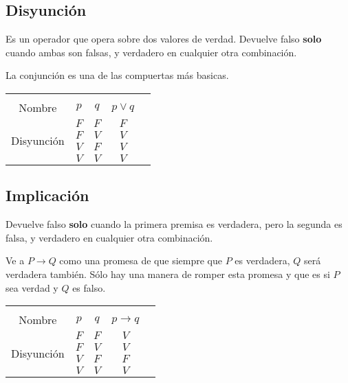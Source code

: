 \documentclass[12pt]{report}                                    %
\begin{document}
        \subsection{Disyunción}

            Es un operador que opera sobre dos valores de verdad. Devuelve falso
            \textbf{solo} cuando ambas son falsas, y verdadero en cualquier
            otra combinación.

            La conjunción es una de las compuertas más basicas. \\

            \begin{tabular}{ |c|c|c|c|c| } 
                \hline &&&\\
                \large{Nombre} & $p$ & $q$ & $p \lor q$ \\[0.5em]
                \hline
                \multirow{4}{5em}{Disyunción}
                & $F$ & $F$ & $F$ \\ \cline{2-4}
                & $F$ & $V$ & $V$ \\ \cline{2-4}
                & $V$ & $F$ & $V$ \\ \cline{2-4}
                & $V$ & $V$ & $V$ \\ 
                \hline
            \end{tabular}





        \clearpage
        \subsection{Implicación}

            Devuelve falso \textbf{solo} cuando la primera premisa es verdadera, pero la 
            segunda es falsa, y verdadero en cualquier otra combinación.

            Ve a $P \to Q$ como una promesa de que siempre que $P$ es verdadera, $Q$ será verdadera también.
            Sólo hay una manera de romper esta promesa y que es si $P$ sea verdad y $Q$ es falso.\\


            \begin{tabular}{ |c|c|c|c|c| } 
                \hline &&&\\
                \large{Nombre} & $p$ & $q$ & $p \to q$ \\[0.5em]
                \hline
                \multirow{4}{5em}{Disyunción}
                & $F$ & $F$ & $V$ \\ \cline{2-4}
                & $F$ & $V$ & $V$ \\ \cline{2-4}
                & $V$ & $F$ & $F$ \\ \cline{2-4}
                & $V$ & $V$ & $V$ \\ 
                \hline
            \end{tabular}\\[1.0em]
\end{document}
